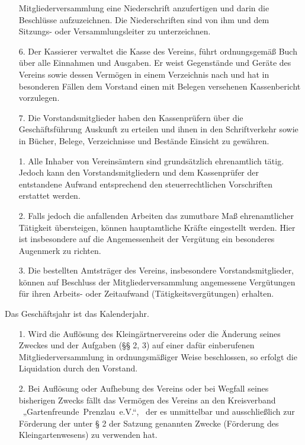 \documentclass{scrartcl}
\begin{document}
\begin{itemize}
			  Mitgliederversammlung eine Niederschrift anzufertigen und darin die
			  Beschlüsse aufzuzeichnen. Die Niederschriften sind von ihm und dem
			  Sitzungs- oder Versammlungsleiter zu unterzeichnen.
	\item[6.] Der Kassierer verwaltet die Kasse des Vereins, führt ordnungsgemäß
			  Buch über alle Einnahmen und Ausgaben. Er weist Gegenstände und Geräte des
			  Vereins sowie dessen Vermögen in einem Verzeichnis nach und hat in
			  besonderen Fällen dem Vorstand einen mit Belegen versehenen Kassenbericht
			  vorzulegen.
	\item[7.] Die Vorstandsmitglieder haben den Kassenprüfern über die Geschäftsführung
			  Auskunft zu erteilen und ihnen in den Schriftverkehr sowie in Bücher,
			  Belege, Verzeichnisse und Bestände Einsicht zu gewähren. 
\end{itemize}



\begin{itemize}
	\item[1.] Alle Inhaber von Vereinsämtern sind grundsätzlich ehrenamtlich tätig.
			  Jedoch kann den Vorstandsmitgliedern und dem
			  Kassenprüfer der entstandene Aufwand entsprechend den
			  steuerrechtlichen Vorschriften erstattet werden.
	\item[2.] Falls jedoch die anfallenden Arbeiten das zumutbare Maß ehrenamtlicher
			  Tätigkeit übersteigen, können hauptamtliche Kräfte eingestellt werden.
			  Hier ist insbesondere auf die Angemessenheit der Vergütung ein besonderes
			  Augenmerk zu richten.
	\item[3.] Die bestellten Amtsträger des Vereins, insbesondere
			  Vorstandsmitglieder, können auf Beschluss der Mitgliederversammlung
			  angemessene Vergütungen für ihren Arbeits- oder Zeitaufwand
			  (Tätigkeitsvergütungen) erhalten.
\end{itemize}



Das Geschäftsjahr ist das Kalenderjahr.



\begin{itemize}
	\item[1.] Wird die Auflösung des Kleingärtnervereins oder die Änderung seines
	          Zweckes und der Aufgaben (§§ 2, 3) auf einer dafür einberufenen
			  Mitgliederversammlung in ordnungsmäßiger Weise beschlossen, so erfolgt die
			  Liquidation durch den Vorstand.
	\item[2.] Bei Auflösung oder Aufhebung des Vereins oder bei Wegfall seines
	          bisherigen Zwecks fällt das Vermögen des Vereins an den
			  Kreisverband ~„Gartenfreunde~Prenzlau~e.V.“,~ der es unmittelbar
			  und ausschließlich zur Förderung der unter § 2 der Satzung genannten
			  Zwecke (Förderung des Kleingartenwesens) zu verwenden hat. 
\end{itemize}
\end{document}
